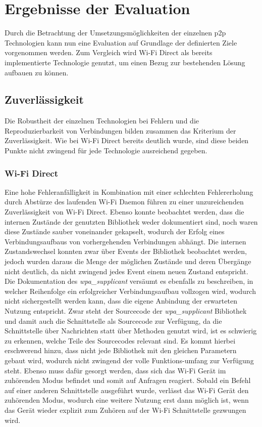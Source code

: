 \section{Ergebnisse der Evaluation}
		Durch die Betrachtung der Umsetzungsmöglichkeiten der einzelnen p2p Technologien kann nun eine Evaluation auf Grundlage der definierten Ziele vorgenommen werden. Zum Vergleich wird Wi-Fi Direct als bereits implementierte Technologie genutzt, um einen Bezug zur bestehenden Lösung aufbauen zu können.
		\subsection{Zuverlässigkeit}
		Die Robustheit der einzelnen Technologien bei Fehlern und die Reproduzierbarkeit von Verbindungen bilden zusammen das Kriterium der Zuverlässigkeit. Wie bei Wi-Fi Direct bereits deutlich wurde, sind diese beiden Punkte nicht zwingend für jede Technologie ausreichend gegeben.
		
		\subsubsection{Wi-Fi Direct} Eine hohe Fehleranfälligkeit in Kombination mit einer schlechten Fehlererholung durch Abstürze des laufenden Wi-Fi Daemon führen zu einer unzureichenden Zuverlässigkeit von Wi-Fi Direct. Ebenso konnte beobachtet werden, dass die internen Zustände der genutzten Bibliothek weder dokumentiert sind, noch waren diese Zustände sauber voneinander gekapselt, wodurch der Erfolg eines Verbindungsaufbaus von vorhergehenden Verbindungen abhängt. Die internen Zustandswechsel konnten zwar über Events der Bibliothek beobachtet werden, jedoch wurden daraus die Menge der möglichen Zustände und deren Übergänge nicht deutlich, da nicht zwingend jedes Event einem neuen Zustand entspricht. Die Dokumentation des {\it wpa\_supplicant} versäumt es ebenfalls zu beschreiben, in welcher Reihenfolge ein erfolgreicher Verbindungsaufbau vollzogen wird, wodurch nicht sichergestellt werden kann, dass die eigene Anbindung der erwarteten Nutzung entspricht.
		Zwar steht der Sourcecode der {\it wpa\_supplicant} Bibliothek und damit auch die Schnittstelle als Sourcecode zur Verfügung, da die Schnittstelle über Nachrichten statt über Methoden genutzt wird, ist es schwierig zu erkennen, welche Teile des Sourcecodes relevant sind. Es kommt hierbei erschwerend hinzu, dass nicht jede Bibliothek mit den gleichen Parametern gebaut wird, wodurch nicht zwingend der volle Funktions-umfang zur Verfügung steht. Ebenso muss dafür gesorgt werden, dass sich das Wi-Fi Gerät im zuhörenden Modus befindet und somit auf Anfragen reagiert. Sobald ein Befehl auf einer anderen Schnittstelle ausgeführt wurde, verlässt das Wi-Fi Gerät den zuhörenden Modus, wodurch eine weitere Nutzung erst dann möglich ist, wenn das Gerät wieder explizit zum Zuhören auf der Wi-Fi Schnittstelle gezwungen wird.
		
